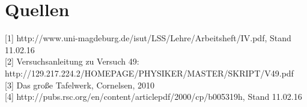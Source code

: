 \documentclass[]{scrartcl}
\begin{document}
\section{Quellen}
{[1]} http://www.uni-magdeburg.de/isut/LSS/Lehre/Arbeitsheft/IV.pdf, Stand 11.02.16 \\
{[2]} Versuchsanleitung zu Versuch 49:
http://129.217.224.2/HOMEPAGE/PHYSIKER/MASTER/SKRIPT/V49.pdf \\
{[3]} Das große Tafelwerk, Cornelsen, 2010 \\
{[4]} http://pubs.rsc.org/en/content/articlepdf/2000/cp/b005319h, Stand 11.02.16
\end{document}
